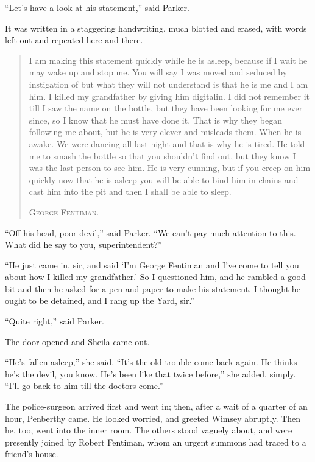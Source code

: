 \enquote{Let's have a look at his statement,} said Parker.

It was written in a staggering handwriting, much blotted and erased, with words left out and repeated here and there.

\begin{quote}
I am making this statement quickly while he is asleep, because if I wait he may wake up and stop me. You will say I was moved and seduced by instigation of but what they will not understand is that he is me and I am him. I killed my grandfather by giving him digitalin. I did not remember it till I saw the name on the bottle, but they have been looking for me ever since, so I know that he must have done it. That is why they began following me about, but he is very clever and misleads them. When he is awake. We were dancing all last night and that is why he is tired. He told me to smash the bottle so that you shouldn't find out, but they know I was the last person to see him. He is very cunning, but if you creep on him quickly now that he is asleep you will be able to bind him in chains and cast him into the pit and then I shall be able to sleep.
\begin{flushright}
\textsc{George Fentiman.}
\end{flushright}
\end{quote}

\enquote{Off his head, poor devil,} said Parker. \enquote{We can't pay much attention to this. What did he say to you, superintendent?}

\enquote{He just came in, sir, and said \enquote{I'm George Fentiman and I've come to tell you about how I killed my grandfather.} So I questioned him, and he rambled a good bit and then he asked for a pen and paper to make his statement. I thought he ought to be detained, and I rang up the Yard, sir.}

\enquote{Quite right,} said Parker.

The door opened and Sheila came out.

\enquote{He's fallen asleep,} she said. \enquote{It's the old trouble come back again. He thinks he's the devil, you know. He's been like that twice before,} she added, simply. \enquote{I'll go back to him till the doctors come.}

The police-surgeon arrived first and went in; then, after a wait of a quarter of an hour, Penberthy came. He looked worried, and greeted Wimsey abruptly. Then he, too, went into the inner room. The others stood vaguely about, and were presently joined by Robert Fentiman, whom an urgent summons had traced to a friend's house.

